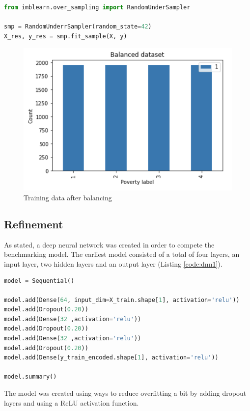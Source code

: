 \documentclass[preprint,12pt]{elsarticle}
\begin{document}
\begin{lstlisting}[language=Python,label={code:balancing},caption={Balance dataset in python}]
from imblearn.over_sampling import RandomUnderSampler

smp = RandomUnderrSampler(random_state=42)
X_res, y_res = smp.fit_sample(X, y)
\end{lstlisting}

\begin{figure}[!h]
\centering\includegraphics[width=0.8\linewidth]{balanced_dataset}
\caption{Training data after balancing}
\label{fig:balanced_dataset}
\end{figure}

\subsection{Refinement}
As stated, a deep neural network was created in order to compete the benchmarking model. The earliest model consisted of a total of four layers, an input layer, two hidden layers and an output layer (Listing \ref{code:dnn1}).

\begin{lstlisting}[language=Python, label={code:dnn1},caption={Earliest Deep Neural Network}]
model = Sequential()

model.add(Dense(64, input_dim=X_train.shape[1], activation='relu'))
model.add(Dropout(0.20))
model.add(Dense(32 ,activation='relu'))
model.add(Dropout(0.20))
model.add(Dense(32 ,activation='relu'))
model.add(Dropout(0.20))
model.add(Dense(y_train_encoded.shape[1], activation='relu'))

model.summary()
\end{lstlisting}

The model was created using ways to reduce overfitting a bit by adding dropout layers\cite{Srivastava:2014} and using a ReLU activation function. 
\end{document}
